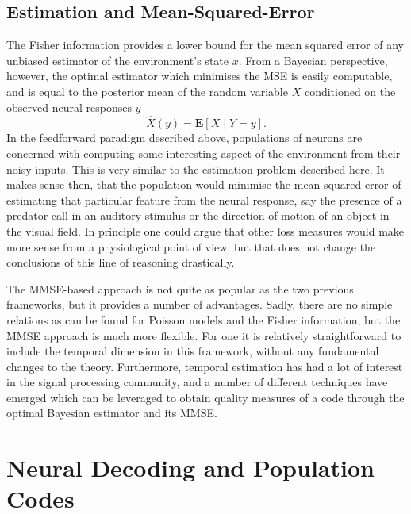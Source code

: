 \subsection{Estimation and Mean-Squared-Error}

The Fisher information provides a lower bound for the mean squared error of any unbiased estimator of the environment's state $x$. From a Bayesian perspective,
however, the optimal estimator which minimises the MSE is easily computable, and is equal to the posterior mean of the random variable $X$ conditioned
on the observed neural responses $y$
\[
\hat{X}(y) = \boldsymbol{E}\left[X\mid Y = y\right].
\]
In the feedforward paradigm described above, populations of neurons are concerned with computing some interesting aspect of the environment from their noisy inputs.
This is very similar to the estimation problem described here. It makes sense then, that the population would minimise the mean squared error of estimating that
particular feature from the neural response, say the presence of a predator call in an auditory stimulus or the direction of motion of an object in the visual field. In 
principle one could argue that
other loss measures would make more sense from a physiological point of view, but that does not change the conclusions of this line of reasoning drastically.\par

The MMSE-based approach is not quite as popular as the two previous frameworks, but it provides a number of advantages. Sadly, there are no simple relations
as can be found for Poisson models and the Fisher information, but the MMSE approach is much more flexible. For one
it is relatively straightforward to include the temporal dimension in this framework, without any fundamental changes to the theory. Furthermore, temporal estimation
has had a lot of interest in the signal processing community, and a number of different techniques have emerged which can be leveraged to obtain quality measures
of a code through the optimal Bayesian estimator and its MMSE.



\section{Neural Decoding and Population Codes}

